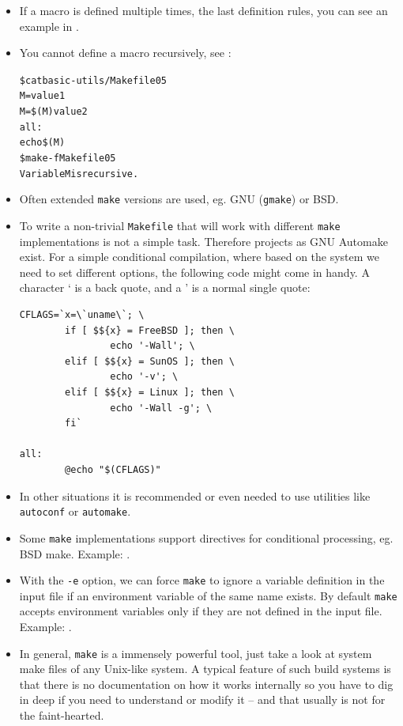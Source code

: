 \begin{itemize}
\item If a macro is defined multiple times, the last definition rules, you can
see an example in .
\item You cannot define a macro recursively, see
:

\begin{alltt}
\$ cat basic-utils/Makefile05
M=value1
M=\$(M) value2
all:
        echo \$(M)
\$ make -f Makefile05
Variable M is recursive.
\end{alltt}
\item Often extended \texttt{make} versions are used, eg. GNU (\texttt{gmake})
or BSD.
\item To write a non-trivial \texttt{Makefile} that will work with
different \texttt{make} implementations is not a simple task.  Therefore
projects as GNU Automake exist.  For a simple conditional compilation, where
based on the system we need to set different options, the following code might
come in handy.  A character ` is a back quote, and a ' is a normal single quote:

\begin{verbatim}
CFLAGS=`x=\`uname\`; \
        if [ $${x} = FreeBSD ]; then \
                echo '-Wall'; \
        elif [ $${x} = SunOS ]; then \
                echo '-v'; \
        elif [ $${x} = Linux ]; then \
                echo '-Wall -g'; \
        fi`

all:
        @echo "$(CFLAGS)"
\end{verbatim}

\item In other situations it is recommended or even needed to use utilities like
\texttt{autoconf} or \texttt{automake}.
\item Some \texttt{make} implementations support directives for conditional
processing, eg.  BSD make.  Example: .
\item With the \texttt{-e} option, we can force \texttt{make} to ignore a
variable definition in the input file if an environment variable of the same
name exists.  By default \texttt{make} accepts environment variables only if
they are not defined in the input file.  Example:
\example{basic-utils/Makefile06}.
\item In general, \texttt{make} is a immensely powerful tool, just take a look
at system make files of any Unix-like system.  A typical feature of such build
systems is that there is no documentation on how it works internally so you have
to dig in deep if you need to understand or modify it -- and that usually is not
for the faint-hearted.
\end{itemize}

